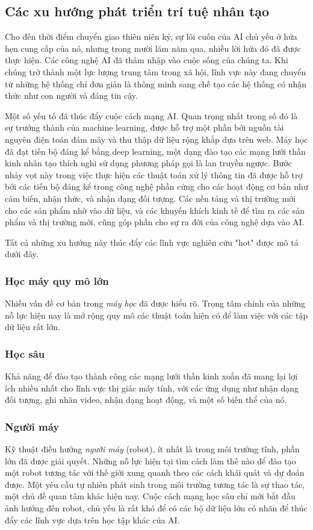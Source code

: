 \subsection{Các xu hướng phát triển trí tuệ nhân tạo}
Cho đến thời điểm chuyển giao thiên niên kỷ, sự lôi cuốn của AI chủ yếu ở hứa hẹn cung cấp của nó, nhưng trong mười lăm năm qua, nhiều lời hứa đó đã được thực hiện. Các công nghệ AI đã thâm nhập vào cuộc sống của chúng ta. Khi chúng trở thành một lực lượng trung tâm trong xã hội, lĩnh vực này đang chuyển từ những hệ thống chỉ đơn giản là thông minh sang chế tạo các hệ thống có nhận thức như con người và đáng tin cậy.\par
Một số yếu tố đã thúc đẩy cuộc cách mạng AI. Quan trọng nhất trong số đó là sự trưởng thành của machine learning, được hỗ trợ một phần bởi nguồn tài nguyên điện toán đám mây và thu thập dữ liệu rộng khắp dựa trên web. Máy học đã đạt tiến bộ đáng kể bằng deep learning, một dạng đào tạo các mạng lưới thần kinh nhân tạo thích nghi sử dụng phương pháp gọi là lan truyền ngược. Bước nhảy vọt này trong việc thực hiện các thuật toán xử lý thông tin đã được hỗ trợ bởi các tiến bộ đáng kể trong công nghệ phần cứng cho các hoạt động cơ bản như cảm biến, nhận thức, và nhận dạng đối tượng. Các nền tảng và thị trường mới cho các sản phẩm nhờ vào dữ liệu, và các khuyến khích kinh tế để tìm ra các sản phẩm và thị trường mới, cũng góp phần cho sự ra đời của công nghệ dựa vào AI.\par
Tất cả những xu hướng này thúc đẩy các lĩnh vực nghiên cứu "hot" được mô tả dưới đây.\par
\subsubsection{Học máy quy mô lớn}
Nhiều vấn đề cơ bản trong \textit{máy học} đã được hiểu rõ. Trọng tâm chính của những nỗ lực hiện nay là mở rộng quy mô các thuật toán hiện có để làm việc với các tập dữ liệu rất lớn.
\subsubsection{Học sâu}
Khả năng để đào tạo thành công các mạng lưới thần kinh xoắn đã mang lại lợi ích nhiều nhất cho lĩnh vực thị giác máy tính, với các ứng dụng như nhận dạng đối tượng, ghi nhãn video, nhận dạng hoạt động, và một số biến thể của nó.
\subsubsection{Người máy}
Kỹ thuật điều hướng \textit{người máy} (robot), ít nhất là trong môi trường tĩnh, phần lớn đã được giải quyết. Những nỗ lực hiện tại tìm cách làm thế nào để đào tạo một robot tương tác với thế giới xung quanh theo các cách khái quát và dự đoán được. Một yêu cầu tự nhiên phát sinh trong môi trường tương tác là sự thao tác, một chủ đề quan tâm khác hiện nay. Cuộc cách mạng học sâu chỉ mới bắt đầu ảnh hưởng đến robot, chủ yếu là rất khó để có các bộ dữ liệu lớn có nhãn để thúc đẩy các lĩnh vực dựa trên học tập khác của AI.
